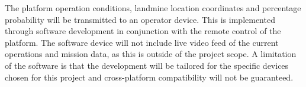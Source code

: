 \documentclass[main.tex]{subfiles}
\begin{document}
The platform operation conditions, landmine location coordinates and percentage probability will be transmitted to an operator device. This is implemented through software development in conjunction with the remote control of the platform. The software device will not include live video feed of the current operations and mission data, as this is outside of the project scope. A limitation of the software is that the development will be tailored for the specific devices chosen for this project and cross-platform compatibility will not be guaranteed.
 
\end{document}
